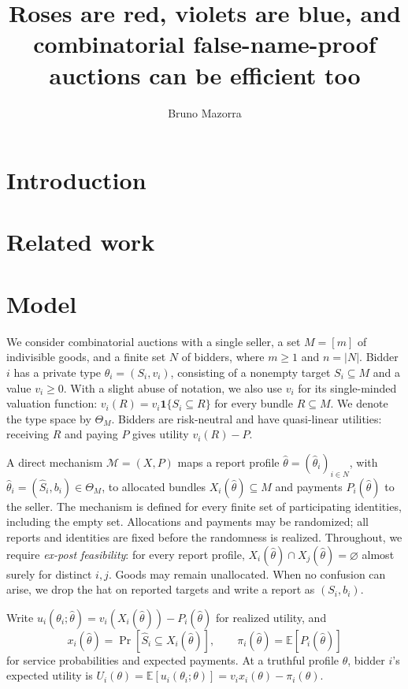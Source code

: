 \documentclass[format=acmsmall, review=false]{acmart}
\title[On sybil-proof combinatorial auctions]{Roses are red, violets are blue, and combinatorial false-name-proof auctions can be efficient too}
\author{Bruno Mazorra}
\begin{document}
\begin{titlepage}
\maketitle

\end{titlepage}
\section{Introduction}
\section{Related work}
\section{Model}
\label{sec:model}

We consider combinatorial auctions with a single seller, a set
$M=[m]$ of indivisible goods, and a finite set $N$ of bidders,
where $m\ge1$ and $n=|N|$. Bidder $i$ has a private type
$\theta_i=(S_i,v_i)$, consisting of a nonempty target
$S_i\subseteq M$ and a value $v_i\ge0$. With a slight abuse of
notation, we also use $v_i$ for its single-minded valuation
function: $v_i(R)=v_i\mathbf{1}\{S_i\subseteq R\}$ for every
bundle $R\subseteq M$. We denote the type space by $\Theta_M$.
Bidders are risk-neutral and have quasi-linear utilities:
receiving $R$ and paying $P$ gives utility $v_i(R)-P$.


A direct mechanism $\mathcal M=(X,P)$ maps a report profile
$\hat\theta=(\hat\theta_i)_{i\in N}$, with
$\hat\theta_i=(\hat S_i,b_i)\in\Theta_M$, to allocated bundles
$X_i(\hat\theta)\subseteq M$ and payments $P_i(\hat\theta)$
to the seller. The mechanism is defined for every finite set of
participating identities, including the empty set. Allocations
and payments may be randomized; all reports and identities are
fixed before the randomness is realized. Throughout, we require
\emph{ex-post feasibility}: for every report profile,
$X_i(\hat\theta)\cap X_j(\hat\theta)=\varnothing$ almost surely
for distinct $i,j$. Goods may remain unallocated. When no
confusion can arise, we drop the hat on reported targets and
write a report as $(S_i,b_i)$.

Write $u_i(\theta_i;\hat\theta)
=v_i(X_i(\hat\theta))-P_i(\hat\theta)$ for realized utility, and
\[
x_i(\hat\theta)
=\Pr[\hat S_i\subseteq X_i(\hat\theta)],
\qquad
\pi_i(\hat\theta)=\mathbb{E}[P_i(\hat\theta)]
\]
for service probabilities and expected payments. At a truthful
profile $\theta$, bidder $i$'s expected utility is
$U_i(\theta)=\mathbb{E}[u_i(\theta_i;\theta)]
=v_i x_i(\theta)-\pi_i(\theta)$.
\end{document}
